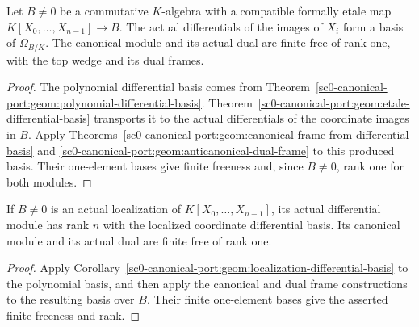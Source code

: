\begin{corollary}
\label{sc0-canonical-port:geom:etale-polynomial-canonical-frame}
\leanok
Let \(B\ne0\) be a commutative \(K\)-algebra with a compatible
formally etale map \(K[X_0,\ldots,X_{n-1}]\to B\).
The actual differentials of the images of \(X_i\) form a basis
of \(\Omega_{B/K}\). The canonical module and its actual dual
are finite free of rank one, with the top wedge and its dual frames.
\end{corollary}
\begin{proof}
The polynomial differential basis comes from
Theorem~\ref{sc0-canonical-port:geom:polynomial-differential-basis}.
Theorem~\ref{sc0-canonical-port:geom:etale-differential-basis} transports it to the
actual differentials of the coordinate images in \(B\).
Apply Theorems~\ref{sc0-canonical-port:geom:canonical-frame-from-differential-basis}
and \ref{sc0-canonical-port:geom:anticanonical-dual-frame} to this produced basis.
Their one-element bases give finite freeness and, since \(B\ne0\),
rank one for both modules.
\end{proof}

\begin{corollary}
\label{sc0-canonical-port:geom:polynomial-localization-canonical-frame}
\leanok
If \(B\ne0\) is an actual localization of
\(K[X_0,\ldots,X_{n-1}]\), its actual differential module has
rank \(n\) with the localized coordinate differential basis.
Its canonical module and its actual dual are finite free of rank one.
\end{corollary}
\begin{proof}
Apply Corollary~\ref{sc0-canonical-port:geom:localization-differential-basis} to the
polynomial basis, and then apply the canonical and dual frame
constructions to the resulting basis over \(B\). Their finite
one-element bases give the asserted finite freeness and rank.
\end{proof}


